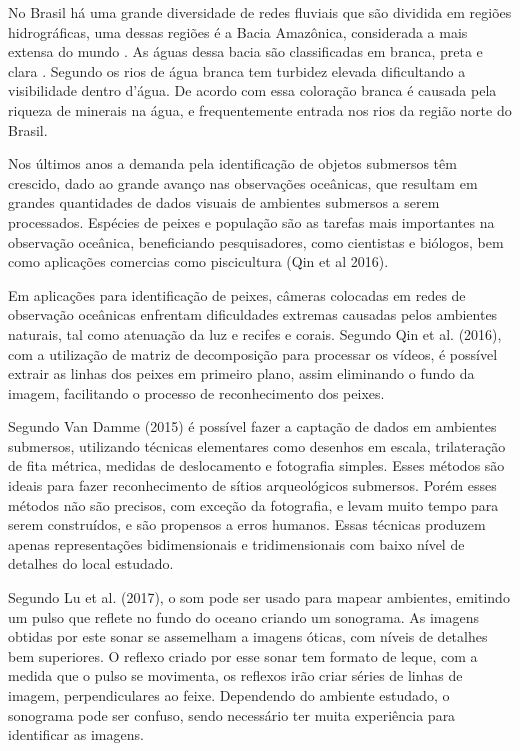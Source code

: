 No Brasil há uma grande diversidade de redes fluviais que são dividida em regiões hidrográficas, uma dessas regiões é a Bacia Amazônica, considerada a mais extensa do mundo \cite{portalbrasil:2009}. As águas dessa bacia são classificadas em branca, preta e clara \cite{sioli:2012}. Segundo  os rios de água branca tem turbidez elevada dificultando a visibilidade dentro d’água. De acordo com  essa coloração branca é causada pela riqueza de minerais na água, e frequentemente entrada nos rios da região norte do Brasil.

Nos últimos anos a demanda pela identificação de objetos submersos têm crescido, dado ao grande avanço nas observações oceânicas, que resultam em grandes quantidades de dados visuais de ambientes submersos a serem processados. Espécies de peixes e população são as tarefas mais importantes na observação oceânica, beneficiando pesquisadores, como cientistas e biólogos, bem como aplicações comercias como piscicultura (Qin et al 2016). 

Em aplicações para identificação de peixes, câmeras colocadas em redes de observação oceânicas enfrentam dificuldades extremas causadas pelos ambientes naturais, tal como atenuação da luz e recifes e corais. Segundo Qin et al. (2016), com a utilização de matriz de decomposição para processar os vídeos, é possível extrair as linhas dos peixes em primeiro plano, assim eliminando o fundo da imagem, facilitando o processo de reconhecimento dos peixes.

Segundo Van Damme (2015) é possível fazer a captação de dados em ambientes submersos, utilizando técnicas elementares como desenhos em escala, trilateração de fita métrica, medidas de deslocamento e fotografia simples. Esses métodos são ideais para fazer reconhecimento de sítios arqueológicos submersos. Porém esses métodos não são precisos, com exceção da fotografia, e levam muito tempo para serem construídos, e são propensos a erros humanos. Essas técnicas produzem apenas representações bidimensionais e tridimensionais com baixo nível de detalhes do local estudado.

Segundo  Lu et al. (2017), o som pode ser usado para mapear ambientes, emitindo um pulso que reflete no fundo do oceano criando um sonograma. As imagens obtidas por este sonar se assemelham a imagens óticas, com níveis de detalhes bem superiores. O reflexo criado por esse sonar tem formato de leque, com a medida que o pulso se movimenta, os reflexos irão criar séries de linhas de imagem, perpendiculares ao feixe. Dependendo do ambiente estudado, o sonograma pode ser confuso, sendo necessário ter muita experiência para identificar as imagens.

